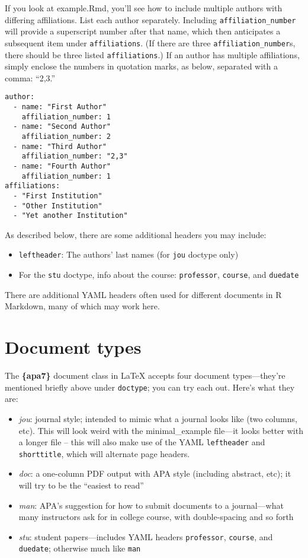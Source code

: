 \documentclass[jou]{apa7}
\providecommand{\tightlist}{%
  \setlength{\itemsep}{0pt}\setlength{\parskip}{0pt}}
\begin{document}
If you look at example.Rmd, you'll see how to include multiple authors
with differing affiliations. List each author separately. Including
\texttt{affiliation\_number} will provide a superscript number after
that name, which then anticipates a subsequent item under
\texttt{affiliations}. (If there are three
\texttt{affiliation\_number}s, there should be three listed
\texttt{affiliations}.) If an author has multiple affiliations, simply
enclose the numbers in quotation marks, as below, separated with a
comma: ``2,3.''

\begin{verbatim}
author: 
  - name: "First Author"
    affiliation_number: 1
  - name: "Second Author"
    affiliation_number: 2
  - name: "Third Author"
    affiliation_number: "2,3"
  - name: "Fourth Author"
    affiliation_number: 1
affiliations:
  - "First Institution"
  - "Other Institution"
  - "Yet another Institution"
\end{verbatim}

As described below, there are some additional headers you may include:

\begin{itemize}
\tightlist
\item
  \texttt{leftheader}: The authors' last names (for \texttt{jou} doctype
  only)
\item
  For the \texttt{stu} doctype, info about the course:
  \texttt{professor}, \texttt{course}, and \texttt{duedate}
\end{itemize}

There are additional YAML headers often used for different documents in
R Markdown, many of which may work here.

\hypertarget{document-types}{%
\section{Document types}\label{document-types}}

The \textbf{\{apa7\}} document class in LaTeX accepts four document
types---they're mentioned briefly above under \texttt{doctype}; you can
try each out. Here's what they are:

\begin{itemize}
\tightlist
\item
  \emph{jou}: journal style; intended to mimic what a journal looks like
  (two columns, etc). This will look weird with the minimal\_example
  file---it looks better with a longer file -- this will also make use
  of the YAML \texttt{leftheader} and \texttt{shorttitle}, which will
  alternate page headers.
\item
  \emph{doc}: a one-column PDF output with APA style (including
  abstract, etc); it will try to be the ``easiest to read''
\item
  \emph{man}: APA's suggestion for how to submit documents to a
  journal---what many instructors ask for in college course, with
  double-spacing and so forth
\item
  \emph{stu}: student papers---includes YAML headers \texttt{professor},
  \texttt{course}, and \texttt{duedate}; otherwise much like
  \texttt{man}
\end{itemize}
\end{document}
